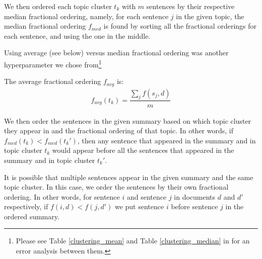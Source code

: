 We then ordered each topic cluster $t_k$ with $m$ sentences by their respective median fractional ordering, namely, for each sentence $j$ in the given topic, the median fractional ordering $f_{med}$ is found by sorting all the fractional orderings for each sentence, and using the one in the middle.

Using average (see below) versus median fractional ordering was another hyperparameter we chose from\footnote{Please see Table \ref{clustering_mean} and Table \ref{clustering_median} in for an error analysis between them.}

The average fractional ordering $f_{avg}$ is:
\begin{align}
    f_{avg}(t_k) = \dfrac{\sum_{j} f(s_j, d)}{m}
\end{align}

We then order the sentences in the given summary based on which topic cluster they appear in and the fractional ordering of that topic. In other words, if $f_{med}(t_k) < f_{med}(t_k')$, then any sentence that appeared in the summary and in topic cluster $t_k$ would appear before all the sentences that appeared in the summary and in topic cluster $t_k'$. 

 It is possible that multiple sentences appear in the given summary and the same topic cluster. In this case, we order the sentences by their own fractional ordering. In other words, for sentence $i$ and sentence $j$ in documents $d$ and $d'$ respectively, if $f(i, d) < f(j, d')$ we put sentence $i$ before sentence $j$ in the ordered summary.



    
